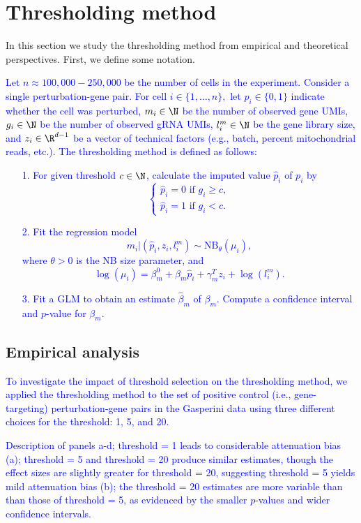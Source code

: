 \documentclass[12pt]{article}
\newcommand{\blue}[1]{\textcolor{blue}{#1}}
\begin{document}
\section{Thresholding method}

In this section we study the thresholding method from empirical and theoretical perspectives. First, we define some notation.

\blue{Let $n \approx 100,000 - 250,000$ be the number of cells in the experiment. Consider a single perturbation-gene pair. For cell $i \in \{ 1, \dots, n \},$ let $p_i \in \{ 0,1 \}$ indicate whether the cell was perturbed, $m_i \in \N$ be the number of observed gene UMIs, $g_i \in \N$ be the number of observed gRNA UMIs, $l^m_i \in \N$ be the gene library size, and $z_i \in \R^{d-1}$ be a vector of technical factors (e.g., batch, percent mitochondrial reads, etc.). The thresholding method is defined as follows:}
\blue{
\begin{itemize}
\item[1.] For given threshold $c \in \N$, calculate the imputed value $\hat{p}_i$ of $p_i$ by $$\begin{cases} \hat{p}_i = 0 \textrm{ if } g_i \geq c, \\ \hat{p}_i = 1 \textrm{ if } g_i < c. \end{cases}$$
\item[2.] Fit the regression model \cite{Sarkar2021}
$$ m_i | \left(\hat{p}_i, z_i, l^m_i \right) \sim \textrm{NB}_\theta(\mu_i),$$ where $\theta >0$ is the NB size parameter, and $$\log\left(\mu_i\right) = \beta_m^0 + \beta_m \hat{p}_i + \gamma^T_m z_i + \log\left( l_i^m\right).$$
\item[3.] Fit a GLM to obtain an estimate $\hat{\beta}_m$ of $\beta_m$. Compute a confidence interval and $p$-value for $\beta_m$.
\end{itemize}}

\subsection{Empirical analysis}

\blue{To investigate the impact of threshold selection on the thresholding method, we applied the thresholding method to the set of positive control (i.e., gene-targeting) perturbation-gene pairs in the Gasperini data using three different choices for the threshold: 1, 5, and 20.}

\blue{Description of panels a-d; threshold = 1 leads to considerable attenuation bias (a); threshold = 5 and threshold = 20 produce similar estimates, though the effect sizes are slightly greater for threshold = 20, suggesting threshold = 5 yields mild attenuation bias (b); the threshold = 20 estimates are more variable than than those of threshold = 5, as evidenced by the smaller $p$-values and wider confidence intervals.}
\end{document}
